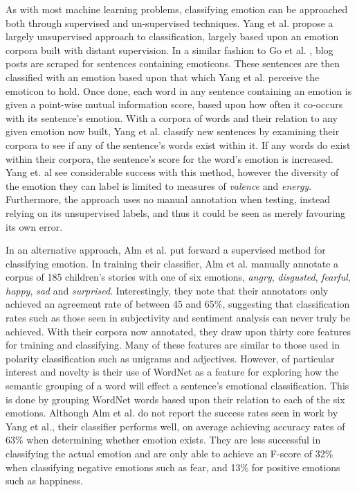 As with most machine learning problems, classifying emotion can be approached both through supervised and un-supervised techniques. Yang et al. \cite{Yang:2007wx} propose a largely unsupervised approach to classification, largely based upon an emotion corpora built with distant supervision. In a similar fashion to Go et al. \cite{Go:2009ut}, blog posts are scraped for sentences containing emoticons. These sentences are then classified with an emotion based upon that which Yang et al. perceive the emoticon to hold. Once done, each word in any sentence containing an emotion is given a point-wise mutual information score, based upon how often it co-occurs with its sentence's emotion. With a corpora of words and their relation to any given emotion now built, Yang et al. classify new sentences by examining their corpora to see if any of the sentence's words exist within it. If any words do exist within their corpora, the sentence's score for the word's emotion is increased. Yang et. al see considerable success with this method, however the diversity of the emotion they can label is limited to measures of \emph{valence} and \emph{energy}. Furthermore, the approach uses no manual annotation when testing, instead relying on its unsupervised labels, and thus it could be seen as merely favouring its own error.

In an alternative approach, Alm et al. \cite{Alm:2005vc} put forward a supervised method for classifying emotion. In training their classifier, Alm et al. manually annotate a corpus of 185 children's stories with one of six emotions, \emph{angry}, \emph{disgusted}, \emph{fearful}, \emph{happy}, \emph{sad} and \emph{surprised}. Interestingly, they note that their annotators only achieved an agreement rate of between 45 and 65\%, suggesting that classification rates such as those seen in subjectivity and sentiment analysis can never truly be achieved. With their corpora now annotated, they draw upon thirty core features for training and classifying. Many of these features are similar to those used in polarity classification such as unigrams and adjectives. However, of particular interest and novelty is their use of WordNet as a feature for exploring how the semantic grouping of a word will effect a sentence's emotional classification. This is done by grouping WordNet words based upon their relation to each of the six emotions. Although Alm et al. do not report the success rates seen in work by Yang et al., their classifier performs well, on average achieving accuracy rates of 63\% when determining whether emotion exists. They are less successful in classifying the actual emotion and are only able to achieve an F-score of 32\% when classifying negative emotions such as fear, and 13\% for positive emotions such as happiness. 


